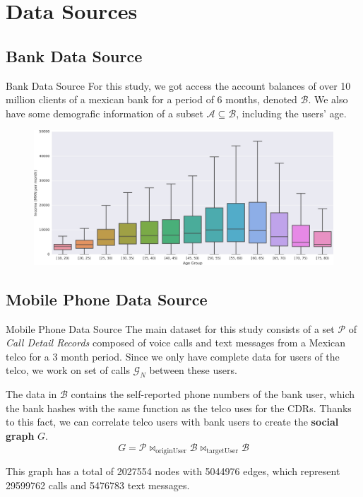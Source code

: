 \documentclass{beamer}
\newcommand{\mathA}{\mathcal{A}}
\newcommand{\mathB}{\mathcal{B}}
\newcommand{\mathG}{\mathcal{G}}
\newcommand{\mathP}{\mathcal{P}}
\begin{document}
\section{Data Sources}
\subsection{Bank Data Source}

\begin{frame}{Bank Data Source}
For this study, we got access the account balances of over 10 million clients of a mexican bank for a period of 6 months, denoted \( \mathB \). We also have some demografic information of a subset \( \mathA \subseteq \mathB \), including the users' age.

\begin{figure}[h]
	\begin{center}
		{\includegraphics[width=\columnwidth]
				{../figures/income_age_boxplot4/income_age_boxplot4_wide.png}
		}\label{income_age_boxplot}
	\end{center}
\end{figure}
\end{frame}

\subsection{Mobile Phone Data Source}

\begin{frame}{Mobile Phone Data Source}
The main dataset for this study consists of a set \( \mathP \) of \textit{Call Detail Records} composed of voice calls and text messages from a Mexican telco for a 3 month period. Since we only have complete data for users of the telco, we work on set of calls \( \mathG_N \) between these users.

\medskip

The data in \( \mathB \) contains the self-reported phone numbers of the bank user, which the bank hashes with the same function as the telco uses for the CDRs. Thanks to this fact, we can correlate telco users with bank users to create the \textbf{social graph} \( G \).
\[
	G = \mathP \bowtie_{\operatorname{originUser}} \mathB \bowtie_{\operatorname{targetUser}} \mathB
\]

This graph has a total of \num{2027554} nodes with \num{5044976} edges, which represent \num{29599762} calls and \num{5476783} text messages.
\end{frame}
\end{document}
